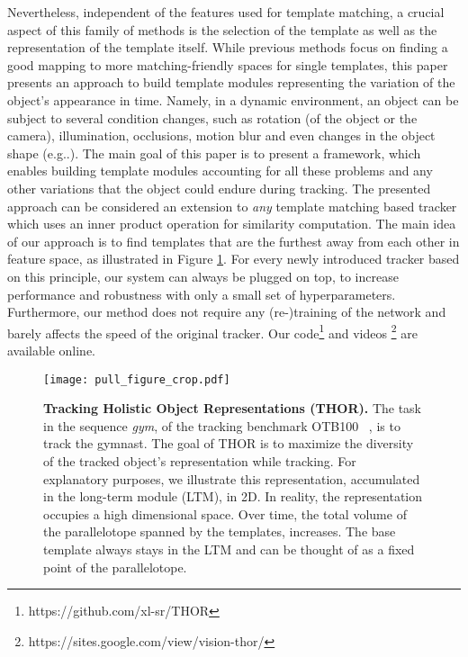 \documentclass{article}
\makeatletter
\DeclareRobustCommand\onedot{\futurelet\@let@token\@onedot}
\def\@onedot{\ifx\@let@token.\else.\null\fi\xspace}
\def\eg{e.g\onedot} \def\Eg{E.g\onedot}
\makeatother
\begin{document}
Nevertheless, independent of the features used for template matching, a crucial aspect of this family of methods is the selection of the template as well as the representation of the template itself. While previous methods focus on finding a good mapping to more matching-friendly spaces for single templates, this paper presents an approach to build template modules representing the variation of the object's appearance in time. Namely, in a dynamic environment, an object can be subject to several condition changes, such as rotation (of the object or the camera), illumination, occlusions, motion blur and even changes in the object shape (\eg{ due to a deformation}). The main goal of this paper is to present a framework, which enables building template modules accounting for all these problems and any other variations that the object could endure during tracking. The presented approach can be considered an extension to \textit{any} template matching based tracker which uses an inner product operation for similarity computation. The main idea of our approach is to find templates that are the furthest away from each other in feature space, as illustrated in Figure \ref{fig:templates}. For every newly introduced tracker based on this principle, our system can always be plugged on top, to increase performance and robustness with only a small set of hyperparameters. Furthermore, our method does not require any (re-)training of the network and barely affects the speed of the original tracker. Our code\footnote{https://github.com/xl-sr/THOR} and videos \footnote{https://sites.google.com/view/vision-thor/} are available online.

\begin{figure}[htb!]
    \centering
    \texttt{[image: pull\_figure\_crop.pdf]}
    \caption{\textbf{Tracking Holistic Object Representations (THOR).} 
    The task in the sequence \textit{gym}, of the tracking benchmark OTB100 ~\cite{OTB2015}, is to track the gymnast. The goal of THOR is to maximize the diversity of the tracked object's representation while tracking. For explanatory purposes, we illustrate this representation, accumulated in the long-term module (LTM), in 2D. In reality, the representation occupies a high dimensional space. Over time, the total volume of the parallelotope spanned by the templates, increases. The base template  always stays in the LTM and can be thought of as a fixed point of the parallelotope.}
    \label{fig:templates}
\end{figure}
\end{document}
